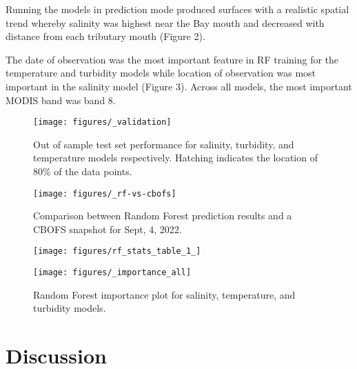 \documentclass{article}
\begin{document}
Running the models in prediction mode produced surfaces with a realistic spatial trend whereby salinity was highest near the Bay mouth and decreased with distance from each tributary mouth (Figure 2).

The date of observation was the most important feature in RF training for the temperature and turbidity models while location of observation was most important in the salinity model (Figure 3). Across all models, the most important MODIS band was band 8.


\begin{figure}[ht!]
    \begin{center}
          \texttt{[image: figures/\_validation]}
          \caption{Out of sample test set performance for salinity, turbidity, and temperature models respectively. Hatching indicates the location of 80\% of the data points.}
    \end{center}    
\end{figure}

\begin{figure}[ht!]
    \begin{center}
          \texttt{[image: figures/\_rf-vs-cbofs]}
          \caption{Comparison between Random Forest prediction results and a CBOFS snapshot for Sept, 4, 2022.}
    \end{center}    
\end{figure}

\begin{figure}[ht!]
    \begin{center}
          \texttt{[image: figures/rf\_stats\_table\_1\_]}          
    \end{center}    
\end{figure}

\begin{figure}[ht!]
    \begin{center}
          \texttt{[image: figures/\_importance\_all]}
          \caption{Random Forest importance plot for salinity, temperature, and turbidity models.}
    \end{center}    
\end{figure}

\section{Discussion}

\FloatBarrier


\end{document}
